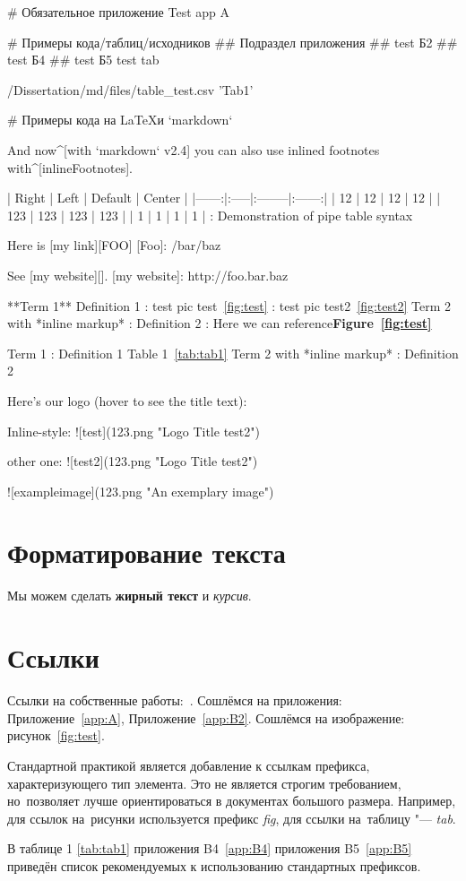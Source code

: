 # Обязательное приложение \label{app:A}
Test app A

# Примеры кода/таблиц/исходников \label{app:B}
## Подраздел приложения \label{app:B1}
## test Б2 \label{app:B2}
## test Б4 \label{app:B4}
## test Б5 \label{app:B5}
test tab

/Dissertation/md/files/table_test.csv  'Tab1\label{tab:tab1}'

\listoftodos

# Примеры кода на \LaTeX и `markdown`

And now^[with `markdown` v2.4] you can also use inlined footnotes with^[inlineFootnotes].

| Right | Left | Default | Center |
|------:|:-----|:--------|:------:|
|    12 | 12   | 12      |   12   |
|   123 | 123  | 123     |  123   |
|     1 | 1    | 1       |   1    |
: Demonstration of pipe table syntax

Here is [my link][FOO]
[Foo]: /bar/baz

See [my website][].
[my website]: http://foo.bar.baz

**Term 1**
Definition 1
: test pic test~\ref{fig:test}
: test pic test2~\ref{fig:test2}
Term 2 with *inline markup*
: Definition 2
: Here we can reference\textbf{Figure~\ref{fig:test}}

Term 1
: Definition 1 Table 1~\ref{tab:tab1}
Term 2 with *inline markup*
: Definition 2

Here's our logo (hover to see the title text):

Inline-style:
![test](123.png "Logo Title test2")

other one:
![test2](123.png "Logo Title test2")

![exampleimage](123.png "An exemplary image")

\section{Форматирование текста}\label{sec:ch1/sec1}

Мы можем сделать \textbf{жирный текст} и \textit{курсив}.

\section{Ссылки}\label{sec:ch1/sec2}

Ссылки на собственные работы:~\cite{vakbib1, confbib1}.
Сошлёмся на приложения: Приложение~\cref{app:A}, Приложение~\cref{app:B2}.
Сошлёмся на изображение: рисунок~\cref{fig:test}.

Стандартной практикой является добавление к ссылкам префикса, характеризующего тип элемента.
Это не является строгим требованием, но~позволяет лучше ориентироваться в документах большого размера.
Например, для ссылок на~рисунки используется префикс \textit{fig},
для ссылки на~таблицу "--- \textit{tab}.

В таблице 1 \cref{tab:tab1} приложения B4~\cref{app:B4} приложения B5~\cref{app:B5} приведён список рекомендуемых
к использованию стандартных префиксов.